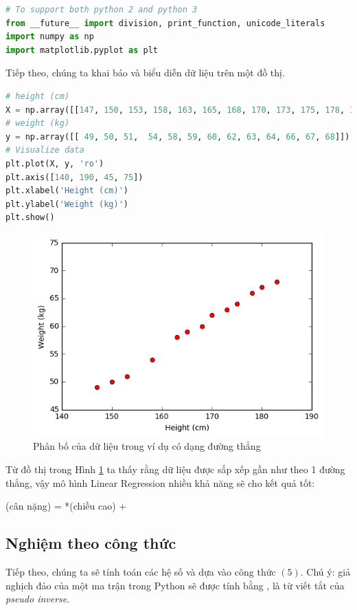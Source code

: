  
\begin{lstlisting}[language=Python]
# To support both python 2 and python 3 
from __future__ import division, print_function, unicode_literals 
import numpy as np  
import matplotlib.pyplot as plt 
\end{lstlisting}
 
Tiếp theo, chúng ta khai báo và biểu diễn dữ liệu trên một đồ thị. 
 
 
\begin{lstlisting}[language=Python]
# height (cm) 
X = np.array([[147, 150, 153, 158, 163, 165, 168, 170, 173, 175, 178, 180, 183]]).T 
# weight (kg) 
y = np.array([[ 49, 50, 51,  54, 58, 59, 60, 62, 63, 64, 66, 67, 68]]).T 
# Visualize data  
plt.plot(X, y, 'ro') 
plt.axis([140, 190, 45, 75]) 
plt.xlabel('Height (cm)') 
plt.ylabel('Weight (kg)') 
plt.show() 
\end{lstlisting}
 
 
 
 \begin{figure}
 	\centering	
 	\includegraphics[width = .6\textwidth]{../LR/output_3_0.png}
 	\caption{ Phân bố của dữ liệu trong ví dụ có dạng đường thẳng}
 	\label{fig:linearregression_distribution}
 \end{figure}
 
Từ đồ thị trong Hình \ref{fig:linearregression_distribution} ta thấy rằng dữ liệu được sắp xếp gần như theo 1 đường thẳng, vậy mô hình Linear Regression nhiều khả năng sẽ cho kết quả tốt: 
 
(cân nặng) = *(chiều cao) +  
 
 
\subsection{Nghiệm theo công thức}
 
Tiếp theo, chúng ta sẽ tính toán các hệ số  và  dựa vào công thức $(5)$. Chú ý: giả nghịch đảo của một ma trận  trong Python sẽ được tính bằng ,  là từ viết tắt của \textit{pseudo inverse}. 
 
